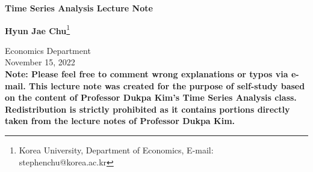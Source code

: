 \documentclass[a4paper,11pt]{report}
\theoremstyle{plain}
\begin{document}
\begin{titlepage}
    \begin{center}
        \vspace*{6cm}
            
        \Huge
        \textbf{Time Series Analysis Lecture Note}
            
        \vspace{0.5cm}
            
        \vspace{1.5cm}
         
        \Large   
        \textbf{Hyun Jae Chu}\footnote[1]{Korea University, Department of Economics, E-mail: stephenchu@korea.ac.kr}
            
        \vspace{0.8cm}
            
        \Large
        Economics Department\\
        November 15, 2022\\

        \vfill
        \large \textbf{Note: Please feel free to comment wrong explanations or typos via e-mail. This lecture note was created for the purpose of self-study based on the content of Professor Dukpa Kim's Time Series Analysis class. Redistribution is strictly prohibited as it contains portions directly taken from the lecture notes of Professor Dukpa Kim.}
        \vspace{0.8cm}
            
    \end{center}
\end{titlepage}
\end{document}

